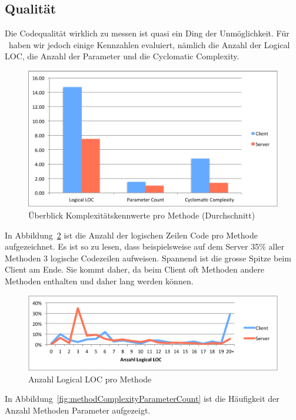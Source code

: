 	\subsection{Qualität}
	Die Codequalität wirklich zu messen ist quasi ein Ding der Unmöglichkeit.
	Für \eeppi\ haben wir jedoch einige Kennzahlen evaluiert,
	nämlich die Anzahl der Logical LOC, die Anzahl der Parameter und die Cyclomatic Complexity.
	\begin{figure}[H]
		\includegraphics[width=\textwidth]{projectPlan/media/img/methodComplexityOverview.pdf}
		\centering
		\caption{Überblick Komplexitätskennwerte pro Methode (Durchschnitt)}
		\label{fig:methodComplexityOverview}
	\end{figure}
	In Abbildung\ \ref{fig:methodComplexityLLOC} ist die Anzahl der logischen Zeilen Code pro Methode aufgezeichnet.
	Es ist so zu lesen, dass beispielsweise auf dem Server 35\% aller Methoden 3 logische Codezeilen aufweisen.
	Spannend ist die grosse Spitze beim Client am Ende.
	Sie kommt daher, da beim Client oft Methoden andere Methoden enthalten und daher lang werden können.
	\begin{figure}[H]
		\includegraphics[width=\textwidth]{projectPlan/media/img/methodComplexityLLOC.pdf}
		\centering
		\caption{Anzahl Logical LOC pro Methode}
		\label{fig:methodComplexityLLOC}
	\end{figure}
	In Abbildung\ \ref{fig:methodComplexityParameterCount} ist die Häufigkeit der Anzahl Methoden Parameter aufgezeigt.
